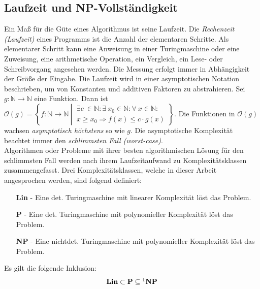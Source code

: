 \subsection{Laufzeit und NP-Vollständigkeit}
Ein Maß für die Güte eines Algorithmus ist seine Laufzeit. Die \emph{Rechenzeit (Laufzeit)} eines Programms ist die Anzahl der elementaren Schritte. Als elementarer Schritt kann eine Anweisung in einer Turingmaschine \cite{turing} oder eine Zuweisung, eine arithmetische Operation, ein Vergleich, ein Lese- oder Schreibvorgang angesehen werden.\newline\newline
Die Messung erfolgt immer in Abhängigkeit der Größe der Eingabe. Die Laufzeit wird in einer asymptotischen Notation beschrieben, um von Konstanten und additiven Faktoren zu abstrahieren.
Sei $g: {{\mathbb N}} \rightarrow {{\mathbb N}}$ eine Funktion.\newline\newline
Dann ist $\mathcal{O}(g) = \left\{ f:{{\mathbb N}} \rightarrow {{\mathbb N}} ~\left|~
\begin{array}{l}
\exists c~ \in {{\mathbb N}} : \exists~ x_0 \in {{\mathbb N}} : \forall~ x \in {{\mathbb N}} : \\
x \geq x_0 \Rightarrow f(x) \leq c \cdot g(x)
\end{array} \right. \right\}$\cite{buchwanke}.\newline\newline
Die Funktionen in $\mathcal{O}(g)$ wachsen \emph{asymptotisch höchstens} so wie $g$. Die asymptotische Komplexität beachtet immer den \emph{schlimmsten Fall (worst-case)}.\\
Algorithmen oder Probleme mit ihrer besten algorithmischen Lösung für den schlimmsten Fall werden nach ihrem Laufzeitaufwand zu Komplexitätsklassen zusammengefasst. Drei Komplexitätsklassen, welche in dieser Arbeit angesprochen werden, sind folgend definiert:
\begin{itemize}
\item[\textbf{Lin}]- Eine det. Turingmaschine mit linearer Komplexität löst das Problem.
\item[\textbf{P}]- Eine det. Turingmaschine mit polynomieller Komplexität löst das Problem.
\item[\textbf{NP}]- Eine nichtdet. Turingmaschine mit polynomieller Komplexität löst das Problem.
\end{itemize}
Es gilt die folgende Inklusion: $$\textbf{Lin}\subset\textbf{P}\subseteq\footnote{\text{Ob \textbf{P}=\textbf{NP} oder \textbf{P}$\neq$ \textbf{NP} ist eines der größten noch offenen Probleme in der theoretischen Informatik}}\textbf{NP} $$
\newpage
